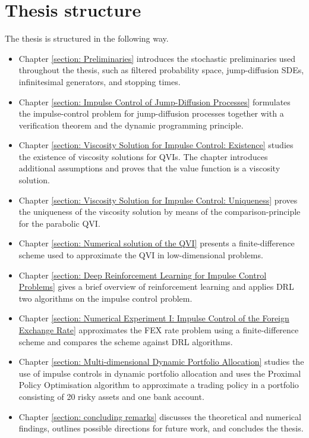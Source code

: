\section*{Thesis structure}
The thesis is structured in the following way.
\begin{itemize}
    \item Chapter \ref{section: Preliminaries} introduces the stochastic preliminaries used throughout the thesis, such as filtered probability space, jump-diffusion SDEs, infinitesimal generators, and stopping times.
    \item Chapter \ref{section: Impulse Control of Jump-Diffusion Processes} formulates the impulse-control problem for jump-diffusion processes together with a verification theorem and the dynamic programming principle. 
    \item Chapter \ref{section: Viscosity Solution for Impulse Control: Existence} studies the existence of viscosity solutions for QVIs. The chapter introduces additional assumptions and proves that the value function is a viscosity solution. 
    \item Chapter \ref{section: Viscosity Solution for Impulse Control: Uniqueness} proves the uniqueness of the viscosity solution by means of the comparison-principle for the parabolic QVI. 
    \item Chapter \ref{section: Numerical solution of the QVI} presents a finite-difference scheme used to approximate the QVI in low-dimensional problems. 
    \item Chapter \ref{section: Deep Reinforcement Learning for Impulse Control Problems} gives a brief overview of reinforcement learning and applies DRL two algorithms on the impulse control problem.
    \item Chapter \ref{section: Numerical Experiment I: Impulse Control of the Foreign Exchange Rate} approximates the FEX rate problem using a finite-difference scheme and compares the scheme against DRL algorithms.
    \item Chapter \ref{section: Multi-dimensional Dynamic Portfolio Allocation} studies the use of impulse controls in dynamic portfolio allocation and uses the Proximal Policy Optimisation algorithm to approximate a trading policy in a portfolio consisting of 20 risky assets and one bank account. 
    \item Chapter \ref{section: concluding remarks} discusses the theoretical and numerical findings, outlines possible directions for future work, and concludes the thesis. 
\end{itemize}

